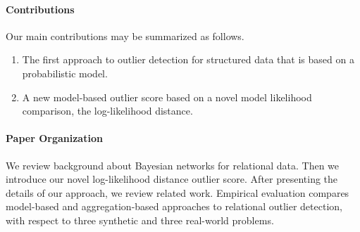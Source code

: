 \documentclass[conference]{IEEEtran}
\begin{document}
\paragraph{Contributions} Our main contributions may be 
 summarized as follows.

\begin{enumerate} 
	\item The first approach to outlier detection for structured data that is based on a probabilistic model. 
	\item A new model-based outlier score based on a novel model likelihood comparison, the log-likelihood distance.  %
	\end{enumerate}

\paragraph{Paper Organization} We review background about Bayesian networks for relational data. Then we introduce our novel log-likelihood distance outlier score. After presenting the details of our approach, we review related work. Empirical evaluation compares model-based and aggregation-based approaches to relational outlier detection, with respect to three synthetic and three real-world problems.

\end{document}

